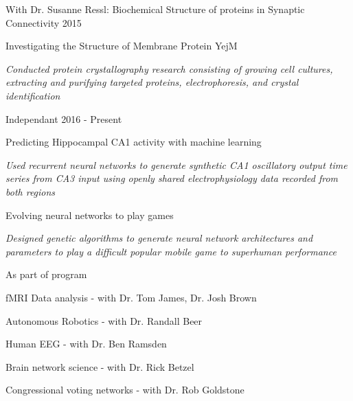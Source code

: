 \begin{cventries}
\cvrpentry
    {With Dr. Susanne Ressl: Biochemical Structure of proteins in Synaptic Connectivity} %
    {} %
    {} %
    {2015} %
    {
      \begin{cvrpitems} %
        \item {Investigating the Structure of Membrane Protein YejM}
            \begin{cvitemsdes} 
	     \item{\textit{Conducted protein crystallography research consisting of growing cell cultures, extracting and purifying targeted proteins, electrophoresis, and crystal identification}}
           \end{cvitemsdes} 
      \end{cvrpitems}
    }

\cvrpentry
    {Independant} %
    {} %
    {} %
    {2016 - Present} %
    {
      \begin{cvrpitems} %
        \item {Predicting Hippocampal CA1 activity with machine learning}
            \begin{cvitemsdes} 
	     \item{\textit{Used recurrent neural networks to generate synthetic CA1 oscillatory output time series from CA3 input using openly shared electrophysiology data recorded from both regions}}
           \end{cvitemsdes} 
	\item {Evolving neural networks to play games}
            \begin{cvitemsdes} 
	     \item{\textit{Designed genetic algorithms to generate neural network architectures and parameters to play a difficult popular mobile game to superhuman performance}}
           \end{cvitemsdes} 
      \end{cvrpitems}
    }

\cvrpentry
    {As part of program} %
    {} %
    {} %
    {} %
    {
      \begin{cvrpitems} %
        \item {fMRI Data analysis - with Dr. Tom James, Dr. Josh Brown}
	\item {Autonomous Robotics - with Dr. Randall Beer}
	\item{Human EEG - with Dr. Ben Ramsden }
	\item{Brain network science - with Dr. Rick Betzel}
	\item{Congressional voting networks - with Dr. Rob Goldstone}
      \end{cvrpitems}
    }




\end{cventries}
